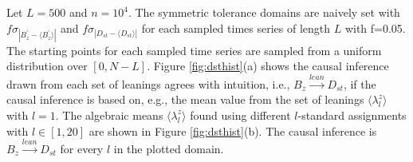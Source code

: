 \documentclass[twocolumn,aps,pre,groupedaddress]{revtex4-1}
\begin{document}
Let $L=500$ and $n=10^4$.  The symmetric tolerance domains are naively set with $f\sigma_{|B_{z}^\prime-\langle B_{z}^\prime\rangle|}$ and $f\sigma_{|D_{st}-\langle D_{st}\rangle|}$ for each sampled times series of length $L$ with f=0.05.  The starting points for each sampled time series are sampled from a uniform distribution over $[0,N-L]$.  Figure \ref{fig:dsthist}(a) shows the causal inference drawn from each set of leanings agrees with intuition, i.e., $B_{z}\xrightarrow{lean}D_{st}$, if the causal inference is based on, e.g., the mean value from the set of leanings $\langle\lambda^z_l\rangle$ with $l=1$.  The algebraic means $\langle\lambda^z_l\rangle$ found using different $l$-standard assignments with $l\in[1,20]$ are shown in Figure \ref{fig:dsthist}(b).  The causal inference is $B_{z}\xrightarrow{lean}D_{st}$ for every $l$ in the plotted domain.
\end{document}
